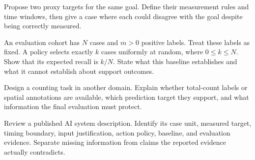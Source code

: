 \begin{challengeexercises}
\item {}Propose two proxy targets for the same goal. Define their measurement rules and time windows, then give a case where each could disagree with the goal despite being correctly measured.
\item {}An evaluation cohort has $N$ cases and $m>0$ positive labels. Treat these labels as fixed. A policy selects exactly $k$ cases uniformly at random, where $0\leq k\leq N$. Show that its expected recall is $k/N$. State what this baseline establishes and what it cannot establish about support outcomes.
\item {}Design a counting task in another domain. Explain whether total-count labels or spatial annotations are available, which prediction target they support, and what information the final evaluation must protect.
\item {}Review a published AI system description. Identify its case unit, measured target, timing boundary, input justification, action policy, baseline, and evaluation evidence. Separate missing information from claims the reported evidence actually contradicts.
\end{challengeexercises}

\clearpage
{\pagestyle{empty}\cleardoublepage}
\endgroup
